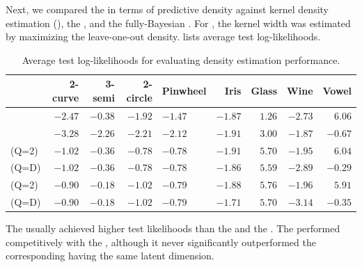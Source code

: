 Next, we compared the \iwmm{} in terms of predictive density against kernel density estimation (\KDE{}), the \iGMM{}, and the fully-Bayesian \gplvm{}.
For \KDE{}, the kernel width was estimated by maximizing the leave-one-out density.
%
 lists average test log-likelihoods.
%
\begin{table}[ht!]
\centering
\caption[Predictive likelihood comparison]
{Average test log-likelihoods for evaluating density estimation performance.}
\label{tab:likelihood}
\begin{tabular}{lrrrm{1cm}rrrr}
\hline
& 2-curve & 3-semi & 2-circle & Pinwheel & Iris  & Glass  & Wine  & Vowel  \\
\hline 
\KDE{} & $-2.47$ & $-0.38$ & $-1.92$ & $-1.47$ & $\mathbf{-1.87}$ & $1.26$ & $-2.73$ & $\mathbf{6.06}$ \\
\iGMM{} & $-3.28$ & $-2.26$ & $-2.21$ & $-2.12$ & $-1.91$ & $3.00$ & $\mathbf{-1.87}$ & $-0.67$ \\
\gplvm{}(Q=2) & $-1.02$ & $-0.36$ & $\mathbf{-0.78}$ & $\mathbf{-0.78}$ & $-1.91$ & $\mathbf{5.70}$ & $\mathbf{-1.95}$ & $\mathbf{6.04}$ \\
\gplvm{}(Q=D) & $-1.02$ & $-0.36$ & $\mathbf{-0.78}$ & $\mathbf{-0.78}$ & $-1.86$ & $\mathbf{5.59}$ & $-2.89$ & $-0.29$ \\
\iwmm{}(Q=2) & $\mathbf{-0.90}$ & $\mathbf{-0.18}$ & $\mathbf{-1.02}$ & $\mathbf{-0.79}$ & $\mathbf{-1.88}$ & $\mathbf{5.76}$ & $\mathbf{-1.96}$ & $\mathbf{5.91}$ \\
\iwmm{}(Q=D) & $\mathbf{-0.90}$ & $\mathbf{-0.18}$ & $\mathbf{-1.02}$ & $\mathbf{-0.79}$ & $\mathbf{-1.71}$ & $\mathbf{5.70}$ & $-3.14$ & $-0.35$ \\
\hline
\end{tabular}
\end{table}


The \iwmm{} usually achieved higher test likelihoods than the \KDE{} and the \iGMM{}.
%
The \gplvm{} performed competitively with the \iwmm{}, although it never significantly outperformed the corresponding \iwmm{} having the same latent dimension.

